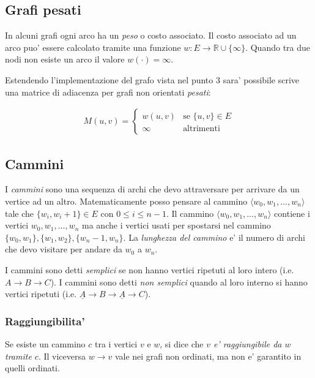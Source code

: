 \documentclass{article}
\begin{document}
\subsection{Grafi pesati}

In alcuni grafi ogni arco ha un \emph{peso} o costo associato. Il costo associato
ad un arco puo' essere calcolato tramite una funzione $w: E \to \mathbb{R} \cup \{\infty\}$. Quando
tra due nodi non esiste un arco il valore $w(\cdot) = \infty$.

Estendendo l'implementazione del grafo vista nel punto $3$ sara' possibile scrive
una matrice di adiacenza per grafi non orientati \emph{pesati}:

\begin{align*}
  M(u, v) = \begin{cases}
    w(u, v) &\text{se } \{u, v\} \in E \\
    \infty &\text{altrimenti}
  \end{cases}
\end{align*}

\subsection{Cammini}

I \emph{cammini} sono una sequenza di archi che devo attraversare per arrivare da
un vertice ad un altro. Matematicamente posso pensare al cammino $\langle w_0,
w_1, \ldots, w_n\rangle$ tale che $\{w_i, w_i+1\} \in E \text{ con } 0 \leq i \leq n-1$.
Il cammino $\langle w_0, w_1, \ldots, w_n \rangle$ contiene i vertici $w_0, w_1, \ldots, w_n$
ma anche i vertici usati per spostarsi nel cammino $\{w_0, w_1\}, \{w_1, w_2\}, \{w_n-1, w_n\}$.
La \emph{lunghezza del cammino} e' il numero di archi che devo visitare per
andare da $w_0$ a $w_n$.

I cammini sono detti \emph{semplici} se non hanno vertici ripetuti al loro intero
(i.e. $A \to B \to C$). I cammini sono detti \emph{non semplici} quando al loro
interno si hanno vertici ripetuti (i.e. $\underline{A} \to B \to \underline{A} \to C$).

\subsubsection{Raggiungibilita'}

Se esiste un cammino $c$ tra i vertici $v$ e $w$, si dice che \emph{$v$ e'
raggiungibile da $w$ tramite $c$}. Il viceversa $w \to v$ vale nei grafi non
ordinati, ma non e' garantito in quelli ordinati.
\end{document}
